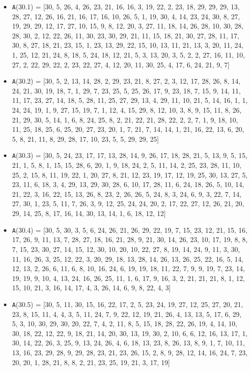 \documentclass[runningheads, a4paper]{llncs}
\begin{document}
\begin{itemize}
	\item {\texttt A(30.1) = } [30, 5, 26, 4, 26, 23, 21, 16, 16, 3, 19, 22, 2, 23, 18, 29, 29, 29, 13, 28, 27, 12, 26, 16, 21, 16, 17, 16, 10, 26, 5, 1, 19, 30, 4, 14, 23, 24, 30, 8, 27, 19, 29, 29, 12, 17, 27, 10, 15, 9, 8, 12, 20, 3, 27, 11, 18, 14, 26, 28, 10, 30, 28, 28, 30, 2, 12, 22, 26, 11, 30, 23, 30, 29, 21, 11, 15, 18, 21, 30, 27, 28, 11, 17, 30, 8, 27, 18, 21, 23, 15, 1, 23, 13, 29, 22, 15, 10, 13, 11, 21, 13, 3, 20, 11, 24, 1, 25, 12, 21, 24, 8, 18, 5, 24, 18, 12, 21, 5, 3, 13, 20, 3, 5, 2, 2, 27, 16, 11, 10, 27, 2, 22, 29, 22, 2, 23, 22, 27, 4, 12, 20, 11, 30, 25, 4, 17, 6, 24, 21, 9, 7]
	
	\item {\texttt A(30.2) = } [30, 5, 2, 13, 14, 28, 2, 29, 23, 21, 8, 27, 2, 3, 12, 17, 28, 26, 8, 14, 24, 21, 30, 19, 18, 7, 1, 29, 7, 23, 25, 5, 25, 26, 17, 9, 23, 18, 7, 15, 9, 14, 11, 11, 17, 23, 27, 14, 18, 5, 28, 11, 25, 27, 29, 13, 4, 29, 11, 10, 21, 5, 14, 16, 1, 1, 24, 24, 19, 1, 9, 27, 15, 19, 7, 1, 12, 4, 15, 29, 8, 12, 10, 3, 8, 9, 15, 11, 8, 26, 21, 29, 30, 5, 14, 1, 6, 8, 24, 25, 8, 2, 21, 22, 21, 28, 22, 2, 2, 7, 1, 9, 18, 10, 11, 25, 18, 25, 6, 25, 20, 27, 23, 20, 1, 7, 21, 7, 14, 14, 1, 21, 16, 22, 13, 6, 20, 5, 8, 21, 11, 8, 29, 28, 17, 10, 23, 5, 5, 29, 29, 25]
	\item {\texttt A(30.3) = } [30, 5, 24, 23, 17, 17, 13, 28, 14, 9, 26, 17, 18, 28, 21, 5, 13, 9, 5, 15, 21, 1, 5, 8, 1, 15, 15, 28, 6, 20, 1, 9, 18, 24, 2, 5, 11, 14, 2, 25, 23, 28, 11, 10, 25, 2, 15, 8, 11, 19, 22, 1, 20, 27, 8, 21, 12, 23, 19, 17, 12, 19, 25, 30, 13, 27, 5, 23, 11, 6, 18, 3, 4, 29, 13, 29, 30, 28, 6, 10, 17, 28, 11, 6, 24, 18, 26, 5, 10, 14, 21, 22, 3, 16, 22, 15, 13, 26, 8, 23, 2, 26, 26, 5, 24, 8, 3, 24, 6, 9, 3, 22, 7, 14, 27, 30, 1, 23, 5, 11, 7, 26, 3, 9, 12, 25, 24, 24, 20, 2, 17, 22, 27, 12, 26, 21, 20, 29, 14, 25, 8, 17, 16, 14, 30, 13, 14, 1, 6, 18, 12, 12]
	\item {\texttt A(30.4) = } [30, 5, 30, 3, 5, 6, 24, 26, 21, 26, 29, 22, 19, 7, 15, 23, 12, 21, 15, 16, 17, 26, 9, 11, 13, 7, 28, 27, 18, 16, 21, 28, 9, 21, 30, 14, 26, 23, 10, 17, 19, 8, 8, 7, 15, 23, 30, 27, 14, 15, 12, 30, 10, 20, 10, 22, 27, 8, 19, 14, 24, 9, 11, 3, 30, 11, 16, 26, 3, 25, 12, 22, 3, 20, 29, 18, 13, 28, 14, 26, 13, 26, 25, 22, 16, 5, 14, 12, 13, 2, 26, 6, 11, 6, 8, 10, 16, 24, 6, 19, 19, 18, 11, 22, 7, 9, 9, 19, 7, 23, 14, 19, 19, 9, 10, 4, 13, 24, 16, 26, 25, 11, 1, 6, 17, 9, 16, 3, 2, 21, 21, 21, 8, 1, 12, 15, 10, 21, 3, 16, 14, 17, 4, 3, 26, 14, 6, 9, 8, 22, 4, 3]
	\item {\texttt A(30.5) = } [30, 5, 11, 30, 15, 16, 22, 17, 2, 5, 23, 24, 19, 27, 12, 25, 27, 20, 21, 23, 8, 15, 11, 4, 4, 3, 5, 11, 24, 7, 9, 22, 12, 19, 21, 26, 4, 13, 13, 5, 17, 6, 29, 5, 3, 10, 30, 29, 30, 20, 22, 7, 4, 2, 11, 8, 5, 15, 18, 28, 22, 26, 19, 4, 14, 10, 30, 18, 22, 12, 22, 9, 18, 21, 14, 20, 30, 13, 19, 30, 2, 10, 6, 6, 12, 16, 13, 17, 1, 30, 14, 22, 26, 3, 25, 9, 13, 24, 26, 4, 6, 18, 13, 23, 8, 26, 13, 8, 9, 1, 7, 10, 11, 13, 16, 23, 29, 28, 9, 29, 28, 23, 21, 23, 26, 15, 2, 8, 9, 28, 12, 14, 16, 24, 7, 23, 20, 20, 1, 28, 21, 8, 8, 2, 21, 23, 25, 19, 21, 3, 17, 19]
	

\end{itemize}
\end{document}
